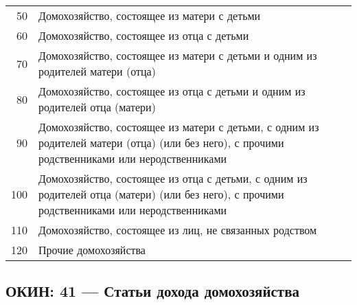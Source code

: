 \documentclass[10pt, a4paper, titlepage]{article}
\begin{document}
\begin{center}
\begin{longtable}{rp{}}
        50 & Домохозяйство, состоящее из матери с детьми \\
        60 & Домохозяйство, состоящее из отца с детьми \\
        70 & Домохозяйство, состоящее из матери с детьми и одним из родителей матери (отца) \\
        80 & Домохозяйство, состоящее из отца с детьми и одним из родителей отца (матери) \\
        90 & Домохозяйство, состоящее из матери с детьми, с одним из родителей матери (отца) (или без него), с прочими родственниками или неродственниками \\
        100 & Домохозяйство, состоящее из отца с детьми, с одним из родителей отца (матери) (или без него), с прочими родственниками или неродственниками \\
        110 & Домохозяйство, состоящее из лиц, не связанных родством \\
        120 & Прочие домохозяйства \\
    \end{longtable}
\end{center}

\subsection{ОКИН: 41 --- Статьи дохода домохозяйства}
\end{document}
